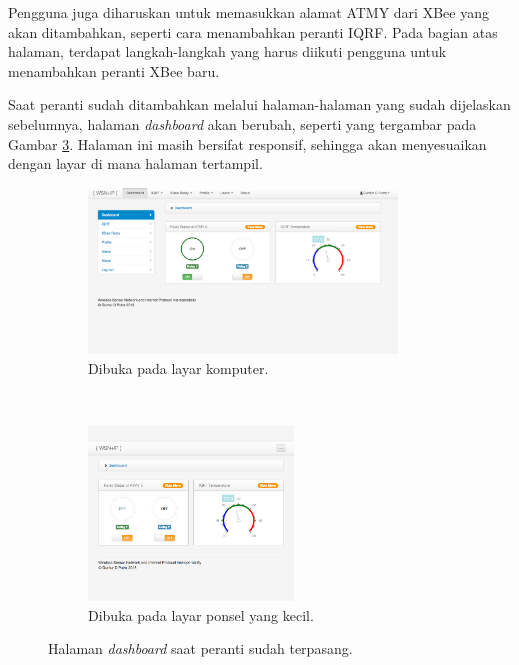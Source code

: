 			Pengguna juga diharuskan untuk memasukkan alamat ATMY dari XBee yang akan ditambahkan, seperti cara menambahkan peranti IQRF. Pada bagian atas halaman, terdapat langkah-langkah yang harus diikuti pengguna untuk menambahkan peranti XBee baru.

			Saat peranti sudah ditambahkan melalui halaman-halaman yang sudah dijelaskan sebelumnya, halaman \emph{dashboard} akan berubah, seperti yang tergambar pada Gambar \ref{dashboard-full-device}. Halaman ini masih bersifat responsif, sehingga akan menyesuaikan dengan layar di mana halaman tertampil.

				\begin{figure}[H]
				  \begin{subfigure}[b]{\textwidth}
				  \centering
				    \includegraphics[width=0.9\textwidth]{gambar/dashboard-full}
				    \caption{Dibuka pada layar komputer.}
				    \label{dashboard-full}
				  \end{subfigure}
				~
				  \begin{subfigure}[b]{\textwidth}
				  \centering
				    \includegraphics[width=0.6\textwidth]{gambar/dashboard-full-small}
				    \caption{Dibuka pada layar ponsel yang kecil.}
				    \label{dashboard-full-small}
				  \end{subfigure}
				  \caption{Halaman \emph{dashboard} saat peranti sudah terpasang.}
				  \label{dashboard-full-device}
				\end{figure}

